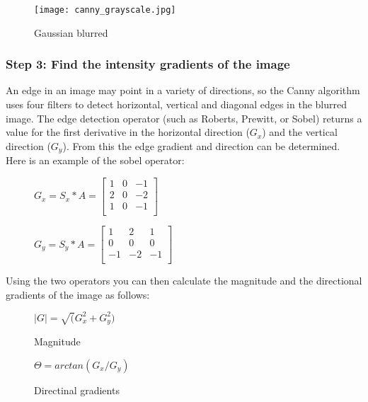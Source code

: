 \begin{figure}[!htb]
    \centering
    \texttt{[image: canny\_grayscale.jpg]}
    \caption{Gaussian blurred}
\end{figure}


\subsubsection{Step 3: Find the intensity gradients of the image}
An edge in an image may point in a variety of directions, so the Canny algorithm uses four filters to detect horizontal, vertical and diagonal edges in the blurred image. The edge detection operator (such as Roberts, Prewitt, or Sobel) returns a value for the first derivative in the horizontal direction ($G_{x}$) and the vertical direction ($G_{y}$). From this the edge gradient and direction can be determined. Here is an example of the sobel operator:

\begin{figure}[!htb]
    \centering
    \begin{minipage}{.5\textwidth}
        \centering
        $G_{x} = S_{x} * A =
        \left[ \begin{array}{rrr}
        1 & 0 & -1 \\
        2 & 0 & -2 \\
        1 & 0 & -1 \\
        \end{array}\right] $
    \end{minipage}%
    \begin{minipage}{.5\textwidth}
        \centering
        $G_{y} = S_{y} * A =
        \left[ \begin{array}{rrr}
        1 & 2 & 1 \\
        0 & 0 & 0 \\
        -1 & -2 & -1 \\
        \end{array}\right] $
    \end{minipage}
\end{figure}

\vspace{5mm}
\noindent Using the two operators you can then calculate the magnitude and the directional gradients of the image as follows:

\begin{figure}[!htb]
    \centering
    \begin{minipage}{.5\textwidth}
        \centering
        $|G| = \sqrt(G^{2}_{x} + G^{2}_{y})$
        \caption{Magnitude}
    \end{minipage}%
    \begin{minipage}{.5\textwidth}
        \centering
        $\Theta = arctan(G_{x}/G_{y})$
        \caption{Directinal gradients}
    \end{minipage}
\end{figure}


